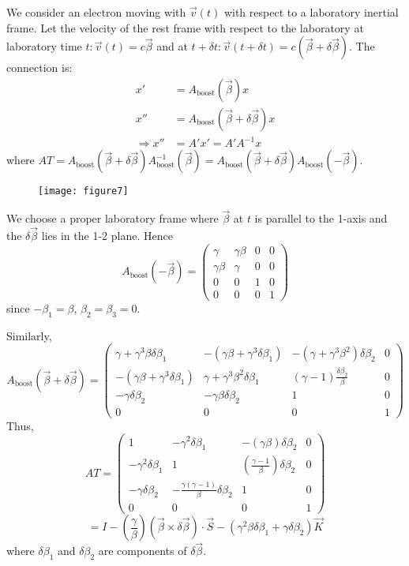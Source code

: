 \documentclass{article}
\begin{document}
	We consider an electron moving with $\vec{v}(t)$ with respect to a laboratory inertial frame.
	Let the velocity of the rest frame with respect to the laboratory at laboratory time $t: \vec{v}(t) = c\vec{\beta}$ and at $t+\delta t: \vec{v}(t+\delta t) = c(\vec{\beta} + \delta\vec{\beta})$.
	The connection is:
	\begin{align*}
		x' &= A_{\text{boost}}(\vec{\beta}) x \\
		x'' &= A_{\text{boost}}(\vec{\beta} + \delta\vec{\beta}) x \\
		\Rightarrow x'' &= A' x' = A' A^{-1} x
	\end{align*}
	where $AT = A_{\text{boost}}(\vec{\beta}+\delta\vec{\beta}) A^{-1}_{\text{boost}}(\vec{\beta}) = A_{\text{boost}}(\vec{\beta}+\delta\vec{\beta}) A_{\text{boost}}(-\vec{\beta})$.
	
	\begin{figure}[h]
		\centering
		\texttt{[image: figure7]}
		\caption{}
		\label{fig:figure7}
	\end{figure}
	
	We choose a proper laboratory frame where $\vec{\beta}$ at $t$ is parallel to the 1-axis and the $\delta\vec{\beta}$ lies in the 1-2 plane.
	Hence
	\[
	A_{\text{boost}}(-\vec{\beta}) = \begin{pmatrix} \gamma & \gamma\beta & 0 & 0 \\ \gamma\beta & \gamma & 0 & 0 \\ 0 & 0 & 1 & 0 \\ 0 & 0 & 0 & 1 \end{pmatrix}
	\]
	since $-\beta_1 = \beta$, $\beta_2 = \beta_3 = 0$.
	
	Similarly,
	\[
	A_{\text{boost}}(\vec{\beta}+\delta\vec{\beta}) = 
	\begin{pmatrix}
		\gamma + \gamma^3 \beta \delta\beta_1 & -(\gamma\beta + \gamma^3 \delta\beta_1) & -(\gamma+\gamma^3\beta^2)\delta\beta_2 & 0 \\
		-(\gamma\beta + \gamma^3 \delta\beta_1) & \gamma+\gamma^3\beta^2\delta\beta_1 & (\gamma-1)\frac{\delta\beta_2}{\beta} & 0 \\
		-\gamma\delta\beta_2 & -\gamma\beta\delta\beta_2 & 1 & 0 \\
		0 & 0 & 0 & 1
	\end{pmatrix}
	\]
	Thus,
	\[
	AT = 
	\begin{pmatrix}
		1 & -\gamma^2 \delta\beta_1 & -(\gamma\beta)\delta\beta_2 & 0 \\
		-\gamma^2 \delta\beta_1 & 1 & (\frac{\gamma-1}{\beta})\delta\beta_2 & 0 \\
		-\gamma\delta\beta_2 & -\frac{\gamma(\gamma-1)}{\beta}\delta\beta_2 & 1 & 0 \\
		0 & 0 & 0 & 1
	\end{pmatrix}
	\]
	\[
	= I - (\frac{\gamma}{\beta}) (\vec{\beta} \times \delta\vec{\beta}) \cdot \vec{S} - (\gamma^2 \beta \delta\beta_1 + \gamma \delta\beta_2) \vec{K}
	\]
	where $\delta\beta_1$ and $\delta\beta_2$ are components of $\delta\vec{\beta}$.
	
\end{document}
